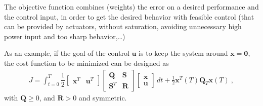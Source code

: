 \documentclass[letterpaper,10pt,english]{jupyterBook}
\begin{document}
\sphinxAtStartPar
The objective function combines (weights) the error on a desired performance and the control input, in order to get the desired behavior with feasible control (that can be provided by actuators, without saturation, avoiding unnecessary high power input and too sharp behavior,…)

\sphinxAtStartPar
As an example, if the goal of the control \(\mathbf{u}\) is to keep the system around \(\mathbf{x} = \mathbf{0}\), the cost function to be minimized can be designed as
\begin{equation*}
\begin{split}J = \int_{t=0}^{T} \dfrac{1}{2} \begin{bmatrix} \mathbf{x}^T & \mathbf{u}^T \end{bmatrix} \begin{bmatrix}  \mathbf{Q} & \mathbf{S} \\ \mathbf{S}^T & \mathbf{R} \end{bmatrix} \begin{bmatrix} \mathbf{x} \\ \mathbf{u} \end{bmatrix} \, dt + \frac{1}{2} \mathbf{x}^T(T) \mathbf{Q}_T \mathbf{x}(T) \ ,\end{split}
\end{equation*}
\sphinxAtStartPar
with \(\mathbf{Q} \ge 0\), and \(\mathbf{R} > 0\) and symmetric.
\end{document}
